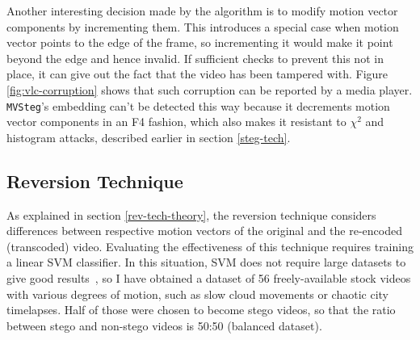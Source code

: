 \documentclass[12pt,british,twoside,notitlepage,usenames,dvipsnames,hypens,final]{report}
\numberwithin{equation}{section}
\numberwithin{figure}{section}
\begin{document}
Another interesting decision made by the algorithm is to modify motion vector components by incrementing them. This introduces a special case when motion vector points to the edge of the frame, so incrementing it would make it point beyond the edge and hence invalid. If sufficient checks to prevent this not in place, it can give out the fact that the video has been tampered with. Figure \ref{fig:vlc-corruption} shows that such corruption can be reported by a media player. \texttt{MVSteg}'s embedding can't be detected this way because it decrements motion vector components in an F4 fashion, which also makes it resistant to $\chi^2$ and histogram attacks, described earlier in section \ref{steg-tech}.

\subsection{Reversion Technique}
\label{rev-tech}

As explained in section \ref{rev-tech-theory}, the reversion technique considers differences between respective motion vectors of the original and the re-encoded (transcoded) video. Evaluating the effectiveness of this technique requires training a linear SVM classifier. In this situation, SVM does not require large datasets to give good results~\cite{cao2012video}, so I have obtained a dataset of 56 freely-available stock videos with various degrees of motion, such as slow cloud movements or chaotic city timelapses. Half of those were chosen to become stego videos, so that the ratio between stego and non-stego videos is 50:50 (balanced dataset).
\end{document}
